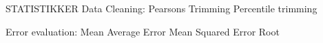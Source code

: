 STATISTIKKER
	Data Cleaning:
		Pearsons
		Trimming
		Percentile trimming

	Error evaluation:
		Mean Average Error
		Mean Squared Error
		Root 
